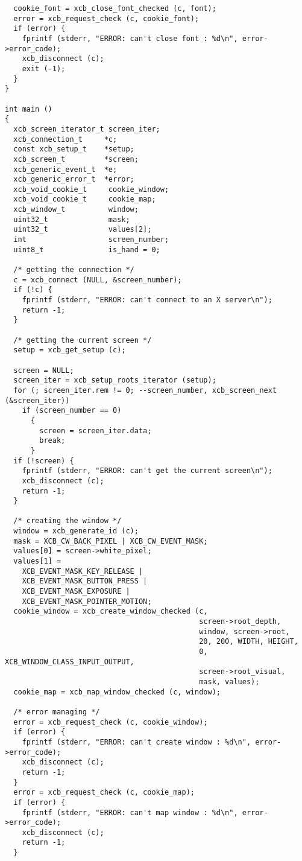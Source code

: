 \documentclass[12pt,oneside,titlepage]{book}
\begin{document}
\begin{enumerate}
\begin{enumerate}
\begin{verbatim}
  cookie_font = xcb_close_font_checked (c, font);
  error = xcb_request_check (c, cookie_font);
  if (error) {
    fprintf (stderr, "ERROR: can't close font : %d\n", error->error_code);
    xcb_disconnect (c);
    exit (-1);
  }
}

int main ()
{
  xcb_screen_iterator_t screen_iter;
  xcb_connection_t     *c;
  const xcb_setup_t    *setup;
  xcb_screen_t         *screen;
  xcb_generic_event_t  *e;
  xcb_generic_error_t  *error;
  xcb_void_cookie_t     cookie_window;
  xcb_void_cookie_t     cookie_map;
  xcb_window_t          window;
  uint32_t              mask;
  uint32_t              values[2];
  int                   screen_number;
  uint8_t               is_hand = 0;

  /* getting the connection */
  c = xcb_connect (NULL, &screen_number);
  if (!c) {
    fprintf (stderr, "ERROR: can't connect to an X server\n");
    return -1;
  }

  /* getting the current screen */
  setup = xcb_get_setup (c);

  screen = NULL;
  screen_iter = xcb_setup_roots_iterator (setup);
  for (; screen_iter.rem != 0; --screen_number, xcb_screen_next (&screen_iter))
    if (screen_number == 0)
      {
        screen = screen_iter.data;
        break;
      }
  if (!screen) {
    fprintf (stderr, "ERROR: can't get the current screen\n");
    xcb_disconnect (c);
    return -1;
  }

  /* creating the window */
  window = xcb_generate_id (c);
  mask = XCB_CW_BACK_PIXEL | XCB_CW_EVENT_MASK;
  values[0] = screen->white_pixel;
  values[1] =
    XCB_EVENT_MASK_KEY_RELEASE |
    XCB_EVENT_MASK_BUTTON_PRESS |
    XCB_EVENT_MASK_EXPOSURE |
    XCB_EVENT_MASK_POINTER_MOTION;
  cookie_window = xcb_create_window_checked (c,
                                             screen->root_depth,
                                             window, screen->root,
                                             20, 200, WIDTH, HEIGHT,
                                             0, XCB_WINDOW_CLASS_INPUT_OUTPUT,
                                             screen->root_visual,
                                             mask, values);
  cookie_map = xcb_map_window_checked (c, window);

  /* error managing */
  error = xcb_request_check (c, cookie_window);
  if (error) {
    fprintf (stderr, "ERROR: can't create window : %d\n", error->error_code);
    xcb_disconnect (c);
    return -1;
  }
  error = xcb_request_check (c, cookie_map);
  if (error) {
    fprintf (stderr, "ERROR: can't map window : %d\n", error->error_code);
    xcb_disconnect (c);
    return -1;
  }


\end{verbatim}
\end{enumerate}
\end{enumerate}
\end{document}
